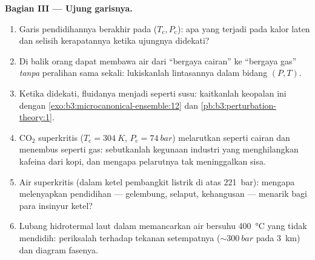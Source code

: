 \begin{problem}
\medskip\noindent\textbf{Bagian III --- Ujung garisnya.}
\begin{enumerate}[resume]
  \item Garis pendidihannya berakhir pada ($T_{\text{c}},
        P_{\text{c}}$): apa yang terjadi pada kalor laten dan selisih
        kerapatannya ketika ujungnya didekati?
  \item Di balik  orang dapat membawa air dari
        ``bergaya cairan'' ke ``bergaya gas'' \emph{tanpa} peralihan
        sama sekali: lukiskanlah lintasannya dalam bidang $(P, T)$.
  \item Ketika  didekati, fluidanya menjadi seperti susu:
        kaitkanlah keopalan ini dengan
        \cref{exo:b3:microcanonical-ensemble:12} dan
        \cref{pb:b3:perturbation-theory:1}.
  \item CO$_2$ superkritis ($T_{\text{c}} = \qty{304}{K}$,
        $P_{\text{c}} = \qty{74}{bar}$) melarutkan seperti cairan
        dan menembus seperti gas: sebutkanlah kegunaan industri yang
        menghilangkan kafeina dari kopi, dan mengapa pelarutnya tak
        meninggalkan sisa.
  \item Air superkritis (dalam ketel pembangkit listrik di atas
        \qty{221}{bar}): mengapa melenyapkan pendidihan --- gelembung,
        selaput, kehangusan --- menarik bagi para insinyur ketel?
  \item Lubang hidrotermal laut dalam memancarkan air bersuhu
        \qty{400}{\celsius} yang tidak mendidih: periksalah terhadap
        tekanan setempatnya ($\sim\qty{300}{bar}$ pada \qty{3}{km}) dan
        diagram fasenya.
\end{enumerate}


\end{problem}
